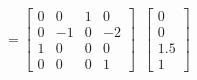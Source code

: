 \documentclass[preview]{standalone}
\begin{document}
\begin{center}
$ = \begin{bmatrix}0 & 0 & 1 & 0 \\ 0 & -1 & 0 & -2 \\ 1 & 0 & 0 & 0\\ 0 & 0 & 0 & 1\end{bmatrix}$\
            $\begin{bmatrix}0 \\ 0 \\ 1.5\\ 1\end{bmatrix}$
\end{center}
\end{document}
